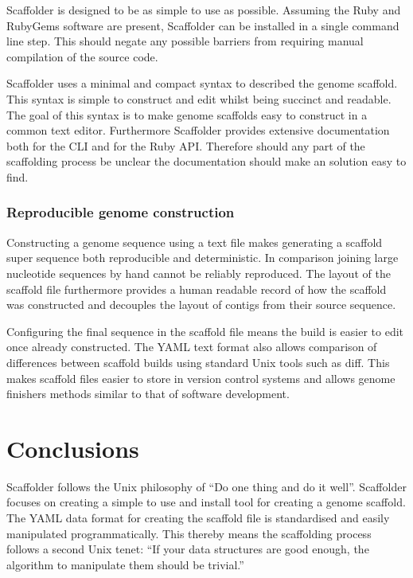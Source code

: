 \documentclass[10pt]{bmc_article}
\newenvironment{bmcformat}{\begin{raggedright}\baselineskip20pt\sloppy\setboolean{publ}{false}}{\end{raggedright}\baselineskip20pt\sloppy}
\begin{document}
\begin{bmcformat}
Scaffolder is designed to be as simple to use as possible. Assuming the Ruby
and RubyGems software are present, Scaffolder can be installed in a single
command line step. This should negate any possible barriers from requiring
manual compilation of the source code. \pb

Scaffolder uses a minimal and compact syntax to described the genome scaffold.
This syntax is simple to construct and edit whilst being succinct and readable.
The goal of this syntax is to make genome scaffolds easy to construct in
a common text editor. Furthermore Scaffolder provides extensive documentation
both for the CLI and for the Ruby API. Therefore should any part of the
scaffolding process be unclear the documentation should make an solution easy
to find. \pb

\subsubsection*{Reproducible genome construction} %

Constructing a genome sequence using a text file makes generating a scaffold
super sequence both reproducible and deterministic. In comparison joining large
nucleotide sequences by hand cannot be reliably reproduced. The layout of the
scaffold file furthermore provides a human readable record of how the scaffold
was constructed and decouples the layout of contigs from their source sequence.
\pb

Configuring the final sequence in the scaffold file means the build is easier
to edit once already constructed. The YAML text format also allows comparison
of differences between scaffold builds using standard Unix tools such as diff.
This makes scaffold files easier to store in version control systems and allows
genome finishers methods similar to that of software development. \pb 

\clearpage

\section*{Conclusions} %

Scaffolder follows the Unix philosophy of ``Do one thing and do it well''.
Scaffolder focuses on creating a simple to use and install tool for creating
a genome scaffold. The YAML data format for creating the scaffold file is
standardised and easily manipulated programmatically. This thereby means the
scaffolding process follows a second Unix tenet: ``If your data structures are
good enough, the algorithm to manipulate them should be trivial.''


\end{bmcformat}
\end{document}
